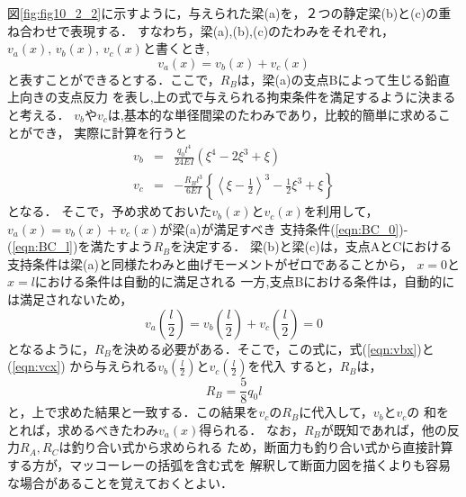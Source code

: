 \documentclass[10pt,a4j]{jarticle}
\begin{document}
\begin{enumerate}
図\ref{fig:fig10_2_2}に示すように，与えられた梁(a)を，２つの静定梁(b)と(c)の重ね合わせで表現する．
すなわち，梁(a),(b),(c)のたわみをそれぞれ，$v_a(x),\,v_b(x),\,v_c(x)$と書くとき,
\begin{equation}
	v_a(x)=v_b(x)+v_c(x)
	\label{eqn:v_sum}
\end{equation}
と表すことができるとする．ここで，$R_B$は，梁(a)の支点Bによって生じる鉛直上向きの支点反力
を表し,上の式で与えられる拘束条件を満足するように決まると考える．
$v_b$や$v_c$は,基本的な単径間梁のたわみであり，比較的簡単に求めることができ，
実際に計算を行うと
\begin{eqnarray}
	v_b&= & 
		\frac{q_0l^4}{24EI} \left( \xi^4-2\xi^3 +\xi \right)
	\label{eqn:vbx}
	\\
	v_c&= & 
		-\frac{R_Bl^3}{6EI} \left\{ \left< \xi-\frac{1}{2}\right>^3 -\frac{1}{2}\xi^3 +\xi \right\}
	\label{eqn:vcx}
\end{eqnarray}
となる．
そこで，予め求めておいた$v_b(x)$と$v_c(x)$を利用して，$v_a(x)=v_b(x)+v_c(x)$が梁(a)が満足すべき
支持条件(\ref{eqn:BC_0})-(\ref{eqn:BC_l})を満たすよう$R_B$を決定する．
梁(b)と梁(c)は，支点AとCにおける支持条件は梁(a)と同様たわみと曲げモーメントがゼロであることから，
$x=0$と$x=l$における条件は自動的に満足される
一方,支点Bにおける条件は，自動的には満足されないため，
\begin{equation}
	v_a\left(\frac{l}{2}\right)
	=
	v_b\left(\frac{l}{2}\right)
	+
	v_c\left(\frac{l}{2}\right)
	=0
	\label{eqn:constraint}
\end{equation}
となるように，$R_B$を決める必要がある．そこで，この式に，式(\ref{eqn:vbx})と(\ref{eqn:vcx})
から与えられる$v_b\left(\frac{l}{2}\right)$と$v_c\left(\frac{l}{2}\right)$を代入
すると，$R_B$は，
\begin{equation}
	R_B=\frac{5}{8}q_0l
\end{equation}
と，上で求めた結果と一致する．この結果を$v_c$の$R_B$に代入して，$v_b$と$v_c$の
和をとれば，求めるべきたわみ$v_a(x)$得られる．
なお，$R_B$が既知であれば，他の反力$R_A,R_C$は釣り合い式から求められる
ため，断面力も釣り合い式から直接計算する方が，マッコーレーの括弧を含む式を
解釈して断面力図を描くよりも容易な場合があることを覚えておくとよい．
\end{enumerate}
\end{document}
